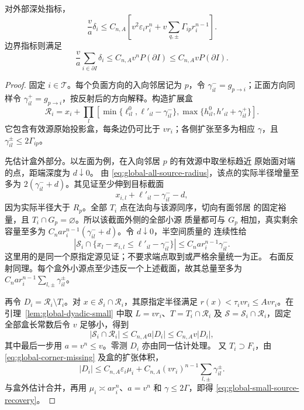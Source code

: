 \begin{lemma}[小半径源质量的回收]\label{lem:global-small-source-recovery}
对外部深处指标，
\begin{equation}\label{eq:global-small-source-recovery}
 \frac va\delta_i\le C_{n,A}\left[
 v^2\varepsilon_i r_i^n+
 v\sum_{q,\pm}\Gamma_{ip}r_i^{n-1}\right].
\end{equation}
边界指标则满足
\begin{equation}\label{eq:global-small-source-boundary}
 \frac va\sum_{i\in\partial I}\delta_i
 \le C_{n,A}v^nP(\partial I)\le C_{n,A}vP(\partial I).
\end{equation}
\end{lemma}
\begin{proof}
固定 \(i\in\mathcal T\)。每个负面方向的入向邻居记为 \(p\)，令
\(\gamma_{il}^-=g_{p\to i}\)；正面方向同样令
\(\gamma_{il}^+=g_{p\to i}\)，按反射后的方向解释。构造扩展盒
\[
 \mathcal R_i=x_i+\prod_l
 [\min\{\ell_{il}^0,\ell'_{il}-\gamma_{il}^-\},
  \max\{h_{il}^0,h'_{il}+\gamma_{il}^+\}].
\]
它包含有效源原始投影盒，每条边仍可比于 \(vr_i\)；各侧扩张至多为相应
\(\gamma\)，且 \(\gamma_{il}^\pm\le2\Gamma_{ip}\)。

先估计盒外部分。以左面为例，在入向邻居 \(p\) 的有效源中取坐标趋近
原始面对端的点，距端深度为 \(d\downarrow0\)。
由 \eqref{eq:global-all-source-radius}，该点的实际半径增量至多为
\(2(\gamma_{il}^-+d)\)。其见证至少伸到目标截面
\[
 x_{i,l}+\ell'_{il}-\gamma_{il}^--d,
\]
因为实际半径大于 \(R_p\)。全部 \(T_i\) 点在法向与该源同序，切向有面邻居
的固定裕量，且 \(T_i\cap G_p=\varnothing\)。所以该截面外侧的全部小源
质量都可与 \(G_p\) 相加，真实剩余容量至多为
\(C_n ar_i^{n-1}(\gamma_{il}^-+d)\)。令 \(d\downarrow0\)，半空间质量的
连续性给
\begin{equation}\label{eq:global-incoming-small-tail}
 |\mathcal S_i\cap\{x_l-x_{i,l}\le
              \ell'_{il}-\gamma_{il}^-\}|
 \le C_n ar_i^{n-1}\gamma_{il}^-.
\end{equation}
这里用的是同一个原指定源见证；不要求端点取到或严格余量统一为正。
右面反射同理。每个盒外小源点至少违反一个上述截面，故其总量至多为
\(C_n ar_i^{n-1}\sum_{l,\pm}\gamma_{il}^\pm\)。

再令 \(D_i=\mathcal R_i\setminus T_i\)。对
\(x\in\mathcal S_i\cap\mathcal R_i\)，其原指定半径满足
\(r(x)<\tau_i vr_i\le Avr_i\)。在引理~\ref{lem:global-dyadic-small} 中取
\(L=vr_i\)、\(T=T_i\cap\mathcal R_i\) 及
\(\mathcal S=\mathcal S_i\cap\mathcal R_i\)，固定全部盒长常数后令 \(v\) 足够小，得到
\[
 |\mathcal S_i\cap\mathcal R_i|\le C_{n,A}a|D_i|
                                      \le C_{n,A}v|D_i|,
\]
其中最后一步用 \(a=v^n\le v\)。零测 \(D_i\) 亦由同一估计处理。
又 \(T_i\supset F_i\)，由
\eqref{eq:global-corner-missing} 及盒的扩张体积，
\[
 |D_i|\le C_{n,A}\varepsilon_i\mu_i+
          C_{n,A}(vr_i)^{n-1}\sum_{l,\pm}\gamma_{il}^\pm.
\]
与盒外估计合并，再用 \(\mu_i\asymp ar_i^n\)、\(a=v^n\) 和
\(\gamma\le2\Gamma\)，即得 \eqref{eq:global-small-source-recovery}。


\end{proof}
